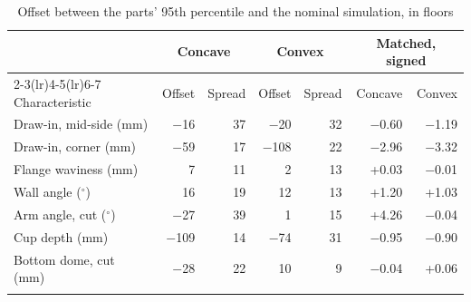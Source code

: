 \documentclass[pdflatex,sn-basic]{sn-jnl}
\newcommand{\tabsize}{\fontsize{8}{9.5}\selectfont}
\begin{document}
\begin{table}[tbp]
\tabsize
\setlength{\tabcolsep}{5pt}
\caption{Offset between the parts' 95th percentile and the nominal simulation, in floors}\label{tab:offsets}
\begin{tabular}{@{}lrrrrrr@{}}
\toprule
 & \multicolumn{2}{c}{Concave} & \multicolumn{2}{c}{Convex} & \multicolumn{2}{c}{Matched, signed} \\
\cmidrule(lr){2-3}\cmidrule(lr){4-5}\cmidrule(lr){6-7}
Characteristic & Offset & Spread & Offset & Spread & Concave & Convex \\
\midrule
Draw-in, mid-side (mm) & $-$16 & 37 & $-$20 & 32 & $-$0.60 & $-$1.19 \\
Draw-in, corner (mm) & $-$59 & 17 & $-$108 & 22 & $-$2.96 & $-$3.32 \\
Flange waviness (mm) & 7 & 11 & 2 & 13 & +0.03 & $-$0.01 \\
Wall angle ($^\circ$) & 16 & 19 & 12 & 13 & +1.20 & +1.03 \\
Arm angle, cut ($^\circ$) & $-$27 & 39 & 1 & 15 & +4.26 & $-$0.04 \\
Cup depth (mm) & $-$109 & 14 & $-$74 & 31 & $-$0.95 & $-$0.90 \\
Bottom dome, cut (mm) & $-$28 & 22 & 10 & 9 & $-$0.04 & +0.06 \\
\botrule
\end{tabular}
\end{table}
\end{document}
